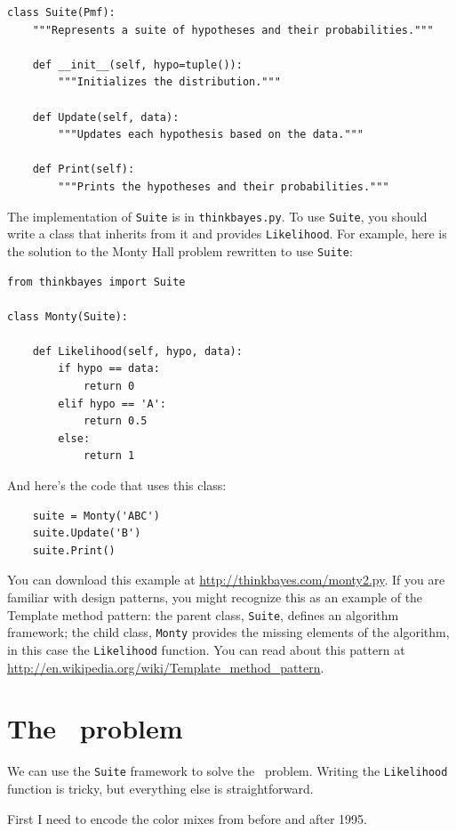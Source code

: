\documentclass[12pt]{book}
\begin{document}
\begin{verbatim}
class Suite(Pmf):
    """Represents a suite of hypotheses and their probabilities."""

    def __init__(self, hypo=tuple()):
        """Initializes the distribution."""

    def Update(self, data):
        """Updates each hypothesis based on the data."""

    def Print(self):
        """Prints the hypotheses and their probabilities."""
\end{verbatim}

The implementation of \verb"Suite" is in \verb"thinkbayes.py".  To use
\verb"Suite", you should write a class that inherits from it and
provides \verb"Likelihood".  For example, here is the solution to the
Monty Hall problem rewritten to use \verb"Suite":

\begin{verbatim}
from thinkbayes import Suite

class Monty(Suite):

    def Likelihood(self, hypo, data):
        if hypo == data:
            return 0
        elif hypo == 'A':
            return 0.5
        else:
            return 1
\end{verbatim}

And here's the code that uses this class:

\begin{verbatim}
    suite = Monty('ABC')
    suite.Update('B')
    suite.Print()
\end{verbatim}

You can download this example at
\url{http://thinkbayes.com/monty2.py}.  If you are familiar with
design patterns, you might recognize this as an example of the
Template method pattern: the parent class, \verb"Suite", defines an
algorithm framework; the child class, \verb"Monty" provides the
missing elements of the algorithm, in this case the \verb"Likelihood"
function.  You can read about this pattern at
\url{http://en.wikipedia.org/wiki/Template_method_pattern}.


\section{The \MM~problem}

We can use the \verb"Suite" framework to solve the \MM~problem.
Writing the \verb"Likelihood" function is tricky, but everything
else is straightforward.

First I need to encode the color mixes from before and
after 1995.
\end{document}
